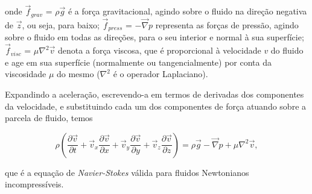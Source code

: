 onde $\vec{f}_{grav}$ = $\rho\vec{g}$ é a força gravitacional, agindo sobre o fluido na direção negativa de $\vec{z}$, ou seja, para baixo; $\vec{f}_{press}$ = $-\vec{\nabla}p$ representa as forças de pressão, agindo sobre o fluido em todas as direções, para o seu interior e normal à sua superfície; $\vec{f}_{visc}$ = $\mu \nabla^{2} \vec{v}$ denota a força viscosa, que 
é proporcional à velocidade $v$ do fluido e age em sua superfície (normalmente ou tangencialmente) por conta da viscosidade $\mu$ do mesmo ($\nabla^{2}$ é o operador Laplaciano).

Expandindo a aceleração, escrevendo-a em termos de derivadas dos componentes da velocidade, e substituindo cada um dos componentes de força atuando sobre a parcela de fluido, temos

\begin{equation*}
\rho \left( \frac{\partial \vec{v}}{\partial t} + \vec{v}_{x}\frac{\partial \vec{v}}{\partial x} + \vec{v}_{y}\frac{\partial \vec{v}}{\partial y} + \vec{v}_{z}\frac{\partial \vec{v}}{\partial z} \right) = \rho\vec{g} - \vec{\nabla}p + \mu \nabla^{2} \vec{v},
\end{equation*}

que é a equação de \textit{Navier-Stokes} válida para fluidos Newtonianos incompressíveis. 